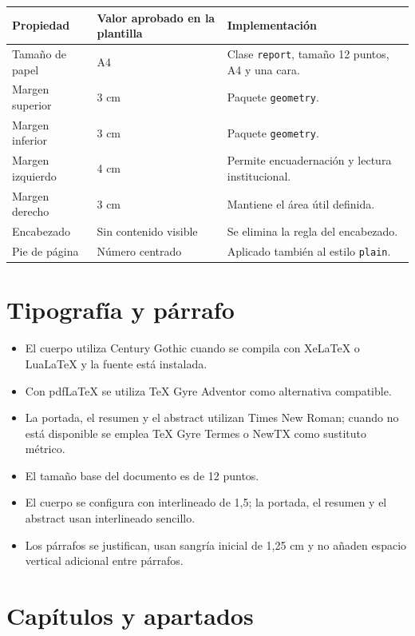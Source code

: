 \documentclass[12pt,a4paper,oneside]{report}
\begin{document}
\begin{longtable}{|p{4cm}|p{4cm}|p{4.4cm}|}
  \hline
  \textbf{Propiedad} & \textbf{Valor aprobado en la plantilla} & \textbf{Implementación} \\
  \hline
  Tamaño de papel & A4 & Clase \texttt{report}, tamaño 12 puntos, A4 y una cara. \\
  \hline
  Margen superior & 3 cm & Paquete \texttt{geometry}. \\
  \hline
  Margen inferior & 3 cm & Paquete \texttt{geometry}. \\
  \hline
  Margen izquierdo & 4 cm & Permite encuadernación y lectura institucional. \\
  \hline
  Margen derecho & 3 cm & Mantiene el área útil definida. \\
  \hline
  Encabezado & Sin contenido visible & Se elimina la regla del encabezado. \\
  \hline
  Pie de página & Número centrado & Aplicado también al estilo \texttt{plain}. \\
  \hline
\end{longtable}

\section{Tipografía y párrafo}

\begin{itemize}
  \item El cuerpo utiliza Century Gothic cuando se compila con XeLaTeX o LuaLaTeX y la fuente está instalada.
  \item Con pdfLaTeX se utiliza TeX Gyre Adventor como alternativa compatible.
  \item La portada, el resumen y el abstract utilizan Times New Roman; cuando no está disponible se emplea TeX Gyre Termes o NewTX como sustituto métrico.
  \item El tamaño base del documento es de 12 puntos.
  \item El cuerpo se configura con interlineado de 1,5; la portada, el resumen y el abstract usan interlineado sencillo.
  \item Los párrafos se justifican, usan sangría inicial de 1,25 cm y no añaden espacio vertical adicional entre párrafos.
\end{itemize}

\section{Capítulos y apartados}
\end{document}
